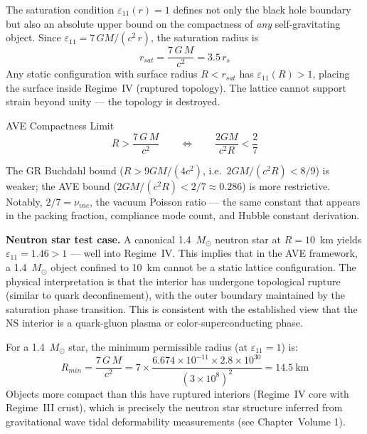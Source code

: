 The saturation condition $\varepsilon_{11}(r) = 1$ defines not only the black hole boundary but also an absolute upper bound on the compactness of \textit{any} self-gravitating object. Since $\varepsilon_{11}= 7\,GM/(c^2\,r)$, the saturation radius is
\begin{equation}
    r_{sat} = \frac{7\,G\,M}{c^2} = 3.5\,r_s
\end{equation}
Any static configuration with surface radius $R < r_{sat}$ has $\varepsilon_{11}(R) > 1$, placing the surface inside Regime~IV (ruptured topology). The lattice cannot support strain beyond unity --- the topology is destroyed.

\begin{resultbox}{AVE Compactness Limit}
\begin{equation}
    R > \frac{7\,G\,M}{c^2} \qquad \Longleftrightarrow \qquad \frac{2GM}{c^2 R} < \frac{2}{7}
\end{equation}
\end{resultbox}

\noindent The GR Buchdahl bound ($R > 9GM/(4c^2)$, i.e.\ $2GM/(c^2 R) < 8/9$) is weaker; the AVE bound ($2GM/(c^2 R) < 2/7 \approx 0.286$) is more restrictive. Notably, $2/7 = \nu_{vac}$, the vacuum Poisson ratio --- the same constant that appears in the packing fraction, compliance mode count, and Hubble constant derivation.

\textbf{Neutron star test case.} A canonical 1.4~$M_\odot$ neutron star at $R = 10$~km yields $\varepsilon_{11} = 1.46 > 1$ --- well into Regime~IV. This implies that in the AVE framework, a 1.4~$M_\odot$ object confined to 10~km cannot be a static lattice configuration. The physical interpretation is that the interior has undergone topological rupture (similar to quark deconfinement), with the outer boundary maintained by the saturation phase transition. This is consistent with the established view that the NS interior is a quark-gluon plasma or color-superconducting phase.

For a 1.4~$M_\odot$ star, the minimum permissible radius (at $\varepsilon_{11} = 1$) is:
\begin{equation}
    R_{min} = \frac{7\,G\,M}{c^2} = 7 \times \frac{6.674 \times 10^{-11} \times 2.8 \times 10^{30}}{(3 \times 10^8)^2} = 14.5~\text{km}
\end{equation}
Objects more compact than this have ruptured interiors (Regime~IV core with Regime~III crust), which is precisely the neutron star structure inferred from gravitational wave tidal deformability measurements (see Chapter~Volume 1).

